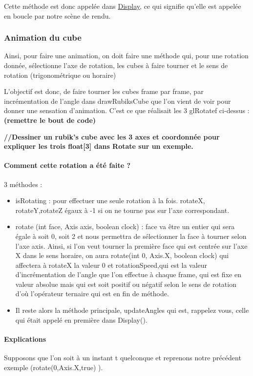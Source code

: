 Cette méthode est donc appelée dans \underline{Display}, ce qui signifie qu’elle est appelée en boucle par notre scène de rendu.

\subsubsection{Animation du cube}
Ainsi, pour faire une animation, on doit faire une méthode qui, pour une rotation donnée, sélectionne l’axe de rotation, les cubes à faire tourner et le sens de rotation (trigonométrique ou horaire)

L’objectif est donc, de faire tourner les cubes frame par frame, par incrémentation de l’angle dans drawRubiksCube que l’on vient de voir pour donner une sensation d’animation. C’est ce que réalisait les 3 glRotatef ci-dessus :  \textbf{(remettre le bout de code)}

\textbf{//Dessiner un rubik’s cube avec les 3 axes et coordonnée pour expliquer les trois float[3] dans Rotate sur un exemple.}

\paragraph{Comment cette rotation a été faite ?}
3 méthodes :
\begin{itemize}
    \item isRotating : pour effectuer une seule rotation à la fois. rotateX, rotateY,rotateZ égaux à -1 si on ne tourne pas sur l’axe correspondant.
    \item rotate (int face, Axis axis, boolean clock) :
face va être un entier qui sera égale à soit 0, soit 2 et nous permettra de sélectionner la face à tourner selon l’axe axis. Ainsi, si l’on veut tourner la première face qui est centrée sur l’axe X dans le sens horaire, on aura rotate(int 0, Axis.X, boolean clock) qui affectera à rotateX la valeur 0 et rotationSpeed,qui est la valeur d’incrémentation de l’angle que l’on effectue à chaque frame, qui est fixe en valeur absolue mais qui est soit positif ou négatif selon le sens de rotation d’où l’opérateur ternaire qui est en fin de méthode.
    \item Il reste alors la méthode principale, updateAngles qui est, rappelez vous, celle qui était appelé en première dans Display().
\end{itemize}

\paragraph{Explications}
Supposons que l’on soit à un instant t quelconque et reprenons notre précédent exemple (rotate(0,Axis.X,true) ).

